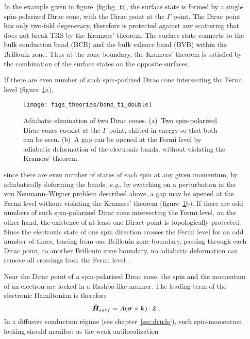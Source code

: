 In the example given in figure~\ref{fig:bg_ti}, the surface state is formed by a single spin-polarized Dirac cone, with the Dirac point at the $\Gamma$ point. The Dirac point has only two-fold degeneracy, therefore is protected against any scattering that does not break TRS by the Kramers' theorem. The surface state connects to the bulk conduction band (BCB) and the bulk valence band (BVB) within the Brillouin zone. Thus at the zone boundary, the Kramers' theorem is satisfied by the combination of the surface states on the opposite surfaces.

If there are even number of such spin-parlized Dirac cone intersecting the Fermi level (figure~\ref{fig:bg_ti_double}a), %
\begin{figure}[ht]%
    \centering%
    \texttt{[image: figs\_theories/band\_ti\_double]}%
    \caption[Adiabatic elimination of two Dirac cones]{\label{fig:bg_ti_double}Adiabatic elimination of two Dirac cones. (a)~Two spin-polarized Dirac cones coexist at the $\Gamma$ point, shifted in energy so that both can be seen. (b)~A gap can be opened at the Fermi level by adiabatic deformation of the electronic bands, without violating the Kramers' theorem.}%
\end{figure}%
%
since there are even number of states of each spin at any given momentum, by adiabatically deforming the bands, \textit{e.g.}, by switching on a perturbation in the von Neumann--Wigner problem described above, a gap may be opened at the Fermi level without violating the Kramers' theorem (figure~\ref{fig:bg_ti_double}b). If there are odd numbers of such spin-polarized Dirac cone intersecting the Fermi level, on the other hand, the existence of at least one Diract point is topologically protected. Since the electronic state of one spin direction crosses the Fermi level for an odd number of times, tracing from one Brillouin zone boundary, passing through each Dirac point, to another Brillouin zone boundary, no adiabatic deformation can remove all crossings from the Fermi level~\cite{Kane2005}.

Near the Dirac point of a spin-polarized Dirac cone, the spin and the momentum of an electron are locked in a Rashba-like manner. The leading term of the electronic Hamiltonian is therefore%
\begin{equation}%
    \op{H}_{surf} = A (\vec{\sigma} \times \vec{k}) \cdot \vu*{z}~.\label{eq:surf_Rashba}%
\end{equation}%
In a diffusive conduction r\'egime (see chapter~\ref{sec:drude}), such spin-momentum locking should manifest as the weak antilocalization